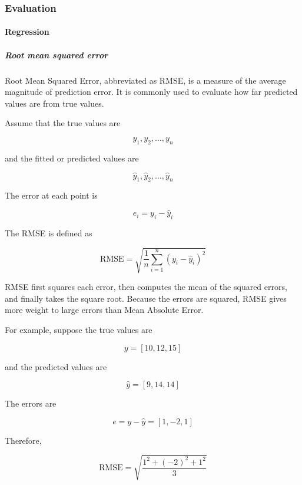 \documentclass{book}
\begin{document}
\subsubsection{Evaluation}

\paragraph{Regression}

\subparagraph{Root mean squared error}


Root Mean Squared Error, abbreviated as RMSE, is a measure of the average magnitude of prediction error. It is commonly used to evaluate how far predicted values are from true values.
    
    Assume that the true values are
    
    \[
        y_1, y_2, \ldots, y_n
    \]
    
    and the fitted or predicted values are
    
    \[
        \hat{y}_1, \hat{y}_2, \ldots, \hat{y}_n
    \]
    
    The error at each point is
    
    \[
        e_i = y_i - \hat{y}_i
    \]
    
    The RMSE is defined as
    
    \[
        \mathrm{RMSE}
        =
        \sqrt{
            \frac{1}{n}
            \sum_{i=1}^{n}
            (
            y_i - \hat{y}_i
            )^2
        }
    \]
    
    RMSE first squares each error, then computes the mean of the squared errors, and finally takes the square root. Because the errors are squared, RMSE gives more weight to large errors than Mean Absolute Error.
    
    For example, suppose the true values are
    
    \[
        y = [10, 12, 15]
    \]
    
    and the predicted values are
    
    \[
        \hat{y} = [9, 14, 14]
    \]
    
    The errors are
    
    \[
        e = y - \hat{y} = [1, -2, 1]
    \]
    
    Therefore,
    
    \[
        \mathrm{RMSE}
        =
        \sqrt{
            \frac{
                1^2 + (-2)^2 + 1^2
            }{3}
        }
    \]
    
\end{document}
